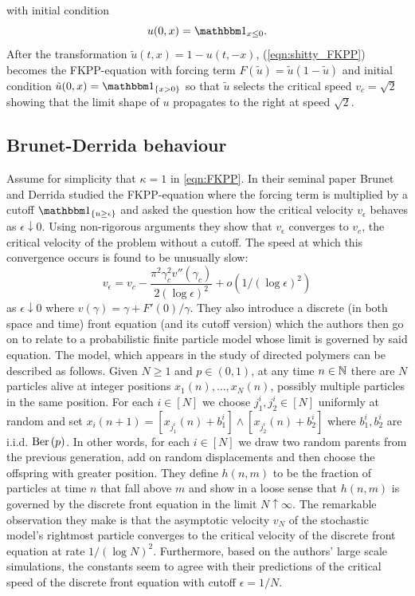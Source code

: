 with initial condition
\begin{equation}\nonumber
u(0, x) = \Ind_{x \leq 0}. 
\end{equation}
After the transformation $\tilde{u}(t, x) = 1 - u(t, - x)$, (\ref{eqn:shitty_FKPP}) becomes the FKPP-equation with forcing term $F(\tilde{u}) = \tilde{u}(1 - \tilde{u})$ and initial condition $\tilde{u}(0, x) = \Ind_{\{ x > 0\}}$ so that $\tilde{u}$ selects the critical speed $v_c = \sqrt{2}$ showing that the limit shape of $u$ propagates to the right at speed $\sqrt{2}$. \\








\subsection{Brunet-Derrida behaviour}
Assume for simplicity that $\kappa = 1$ in \ref{eqn:FKPP}. In their seminal paper \cite{brunet1997shift} Brunet and Derrida studied the FKPP-equation where the forcing term is multiplied by a cutoff $\Ind_{\{ u \geq \epsilon\}}$ and asked the question how the critical velocity $v_\epsilon$ behaves as $\epsilon \downarrow 0$. Using non-rigorous arguments they show that $v_\epsilon$ converges to $v_c$, the critical velocity of the problem without a cutoff. The speed at which this convergence occurs is found to be unusually slow:
\begin{equation}\label{eqn:brun_der_prediction}
v_\epsilon = v_c - \frac{\pi^2 \gamma_c^2 v''(\gamma_c)}{2 (\log \epsilon)^2} + o(1/(\log \epsilon)^2) 
\end{equation}
as $\epsilon \downarrow 0$ where $v(\gamma) = \gamma + F'(0)/\gamma$. They also introduce a discrete (in both space and time) front equation (and its cutoff version) which the authors then go on to relate to a probabilistic finite particle model whose limit is governed by said equation. The model, which appears in the study of directed polymers can be described as follows. Given $N \geq 1$ and $p \in (0,1)$, at any time $n \in \mathbb{N}$ there are $N$ particles alive at integer positions $x_1(n), ..., x_N(n)$, possibly multiple particles in the same position. For each $i \in [N]$ we choose $j^i_1, j^i_2 \in [N]$ uniformly at random and set $x_i(n+1) = [x_{j^i_1}(n) + b^i_1] \land [x_{j^i_2}(n) + b^i_2]$ where $b^i_1, b^i_2$ are i.i.d. $\text{Ber} \left( p \right)$. In other words, for each $i \in [N]$ we draw two random parents from the previous generation, add on random displacements and then choose the offspring with greater position. They define $h(n, m)$ to be the fraction of particles at time $n$ that fall above $m$ and show in a loose sense that $h(n,m)$ is governed by the discrete front equation in the limit $N \uparrow \infty$. The remarkable observation they make is that the asymptotic velocity $v_N$ of the stochastic model's rightmost particle converges to the critical velocity of the discrete front equation at rate $1/(\log N)^2$. Furthermore, based on the authors' large scale simulations, the constants seem to agree with their predictions of the critical speed of the discrete front equation with cutoff $\epsilon = 1/N$. \\

